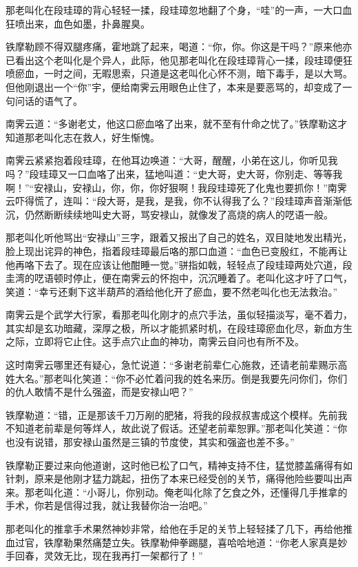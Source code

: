 \documentclass[12pt,oneside]{book}
\begin{document}
那老叫化在段珪璋的背心轻轻一揉，段珪璋忽地翻了个身，``哇''的一声，一大口血狂喷出来，血色如墨，扑鼻腥臭。

铁摩勒顾不得双腿疼痛，霍地跳了起来，喝道：``你，你。你这是干吗？''原来他亦已看出这个老叫化是个异人，此际，他见那老叫化在段珪璋背心一揉，段珪璋便狂喷瘀血，一时之间，无暇思索，只道是这老叫化心怀不测，暗下毒手，是以大骂。但他刚退出一个``你''宇，便给南霁云用眼色止住了，本来是要恶骂的，却变成了一句问话的语气了。

南霁云道：``多谢老丈，他这口瘀血咯了出来，就不至有什命之忧了。''铁摩勒这才知道那老叫化志在救人，好生惭愧。

南霁云紧紧抱着段珪璋，在他耳边唤道：``大哥，醒醒，小弟在这儿，你听见我吗？''段珪璋又一口血咯了出来，猛地叫道：``史大哥，史大哥，你别走、等等我啊！''``安禄山，安禄山，你，你，你好狠啊！我段珪璋死了化鬼也要抓你！''南霁云吓得慌了，连叫：``段大哥，是我，是我，你不认得我了么？''段珪璋声音渐渐低沉，仍然断断续续地叫史大哥，骂安禄山，就像发了高烧的病人的呓语一般。

那老叫化听他骂出``安禄山''三字，跟着又报出了自己的姓名，双目陡地发出精光，脸上现出诧异的神色，指着段珪璋最后咯的那口血道：``血色已变殷红，不能再让他再咯下去了。现在应该让他酣睡一觉。''骈指如戟，轻轻点了段珪璋两处穴道，段圭湾的呓语顿时停止，便在南霁云的怀抱中，沉沉睡着了。老叫化这才吁了口气，笑道：``幸亏还剩下这半葫芦的酒给他化开了瘀血，要不然老叫化也无法救治。''

南霁云是个武学大行家，看那老叫化刚才的点穴手法，虽似轻描淡写，毫不着力，其实却是玄功暗藏，深厚之极，所以才能抓紧时机，在段珪璋瘀血化尽，新血方生之际，立即将它止住。这手点穴止血的神功，南霁云自问也有所不及。

这时南霁云哪里还有疑心，急忙说道：``多谢老前辈仁心施救，还请老前辈赐示高姓大名。''那老叫化笑道：``你不必忙着问我的姓名来历。倒是我要先问你们，你们的仇人敢情不是什么强盗，而是安禄山吧？''

铁摩勒道：``错，正是那该千刀万剐的肥猪，将我的段叔叔害成这个模样。先前我不知道老前辈是何等烊人，故此说了假话。还望老前辈恕罪。''那老叫化笑道：``你也没有说错，那安禄山虽然是三镇的节度使，其实和强盗也差不多。''

铁摩勒正要过来向他道谢，这时他已松了口气，精神支持不住，猛觉膝盖痛得有如针刺，原来是他刚才猛力跳起，扭伤了本来已经受创的关节，痛得他险些要叫出声来。那老叫化道：``小哥儿，你别动。俺老叫化除了乞食之外，还懂得几手推拿的手术，你若是信得过我，就让我替你治一治吧。''

那老叫化的推拿手术果然神妙非常，给他在手足的关节上轻轻揉了几下，再给他推血过官，铁摩勒果然痛楚立失。铁摩勒伸拳踢腿，喜哈哈地道：``你老人家真是妙手回春，灵效无比，现在我再打一架都行了！''
\end{document}
